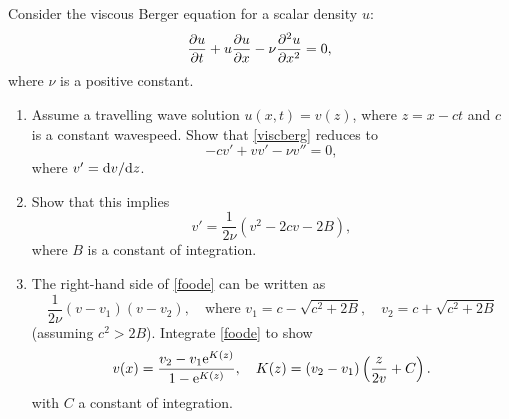 \documentclass[a4paper, 12pt]{article}
\begin{document}
%

\begin{enumerate}[label={\bf \arabic{*}.\;}, ref={\arabic{*}},itemsep=3ex, left=0ex]

    {
      Consider the viscous Berger equation for a scalar density $u$:
      \begin{equation}
        \label{viscberg}
        \pd{u}{t} + u\pd{u}{x} - \nu \pdd{u}{x}=0,
      \end{equation}
      where $\nu$ is a positive constant.
      \begin{enumerate}[label=(\alph*)]
        \item
          Assume a travelling wave solution $u(x,t) =v(z)$, where $z=x-ct$ and $c$ is a constant wavespeed. Show that \cref{viscberg} reduces to
          \begin{equation}
            -cv' + vv' -\nu v'' =0,
          \end{equation}
          where $v'=\fd{v}{z}$.

        \item
          Show that this implies
          \begin{equation}
            \label{foode}
            v' = \frac{1}{2\nu}\left(v^2-2cv -2B\right),
          \end{equation}
          where $B$ is a constant of integration.

        \item The right-hand side of \cref{foode} can be written as
          \begin{equation}
            \frac{1}{2\nu}(v-v_1)(v-v_2), \quad \text{where } v_1 =c-\sqrt{c^2+2B},\quad v_2 = c +\sqrt{c^2 + 2B}
          \end{equation}
          (assuming $c^2>2B$). Integrate \cref{foode} to show
          \begin{equation}
            v(x) = \frac{v_2 - v_1\mathrm{e} ^{K(z)}}{1-\mathrm{e} ^{K(z)}},\quad K(z) = (v_2-v_1)\left( \frac{z}{2v}+C\right).
          \end{equation}
          with $C$ a constant of integration.


\end{enumerate}}
\end{enumerate}
\end{document}
